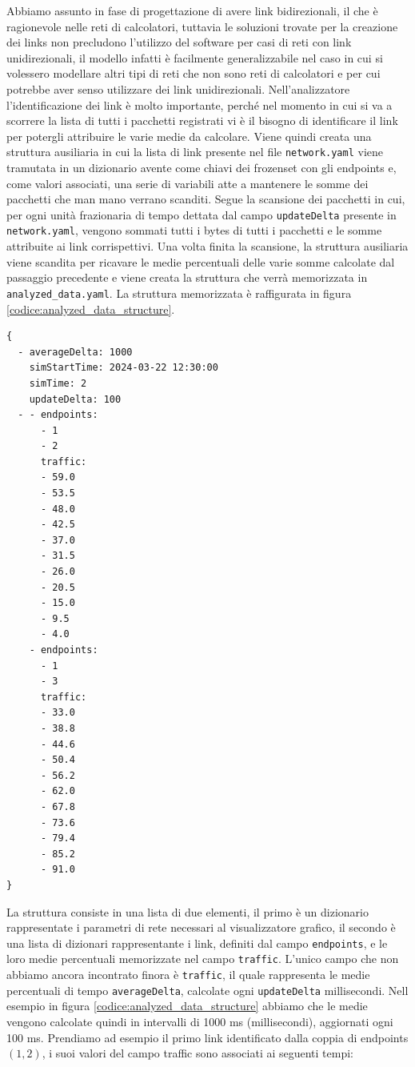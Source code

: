 \documentclass[binding=0.6cm]{sapthesis}
\begin{document}
Abbiamo assunto in fase di progettazione di avere link bidirezionali, il che è ragionevole nelle reti di calcolatori, tuttavia le soluzioni trovate per la creazione dei links 
non precludono l'utilizzo del software per casi di reti con link unidirezionali, il modello infatti è facilmente generalizzabile nel caso in cui si 
volessero modellare altri tipi di reti che non sono reti di calcolatori e per cui potrebbe aver senso utilizzare dei link unidirezionali.
Nell'analizzatore l'identificazione dei link è molto importante, perché nel momento in cui si va a scorrere la lista di tutti i pacchetti registrati
vi è il bisogno di identificare il link per potergli attribuire le varie medie da calcolare. Viene quindi creata una struttura ausiliaria in cui
la lista di link presente nel file \texttt{network.yaml} viene tramutata in un dizionario avente come chiavi dei frozenset con gli endpoints e, come valori associati,
una serie di variabili atte a mantenere le somme dei pacchetti che man mano verrano scanditi.
Segue la scansione dei pacchetti in cui, per ogni unità frazionaria di tempo dettata dal campo \texttt{updateDelta} presente in \texttt{network.yaml}, vengono sommati tutti i bytes di tutti i pacchetti
e le somme attribuite ai link corrispettivi.
Una volta finita la scansione, la struttura ausiliaria viene scandita per ricavare le medie percentuali delle varie somme calcolate dal passaggio precedente e viene
creata la struttura che verrà memorizzata in \texttt{analyzed\_data.yaml}. La struttura memorizzata è raffigurata in figura \ref{codice:analyzed_data_structure}.

{\scriptsize %
\begin{lstlisting}[caption={Rappresentazione della struttura analyzed\_data}, label={codice:analyzed_data_structure}]
{
  - averageDelta: 1000
    simStartTime: 2024-03-22 12:30:00
    simTime: 2
    updateDelta: 100
  - - endpoints:
      - 1
      - 2
      traffic:
      - 59.0
      - 53.5
      - 48.0
      - 42.5
      - 37.0
      - 31.5
      - 26.0
      - 20.5
      - 15.0
      - 9.5
      - 4.0
    - endpoints:
      - 1
      - 3
      traffic:
      - 33.0
      - 38.8
      - 44.6
      - 50.4
      - 56.2
      - 62.0
      - 67.8
      - 73.6
      - 79.4
      - 85.2
      - 91.0
}
\end{lstlisting}
}

La struttura consiste in una lista di due elementi, il primo è un dizionario rappresentate 
i parametri di rete necessari al visualizzatore grafico, il
secondo è una lista di dizionari rappresentante i link, definiti dal campo \texttt{endpoints}, e le loro medie percentuali memorizzate nel campo \texttt{traffic}.
L'unico campo che non abbiamo ancora incontrato finora è \texttt{traffic}, il quale rappresenta le medie percentuali di tempo \texttt{averageDelta}, calcolate ogni \texttt{updateDelta} millisecondi.
Nell esempio in figura \ref{codice:analyzed_data_structure} abbiamo che le medie vengono calcolate quindi in intervalli di 1000 ms (millisecondi), aggiornati ogni
100 ms. Prendiamo ad esempio il primo link identificato dalla coppia di endpoints \((1, 2)\), i suoi valori del campo traffic sono associati ai seguenti tempi:
\newline
\end{document}
